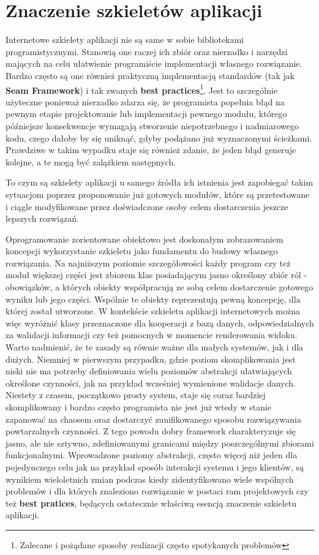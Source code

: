 \section{Znaczenie szkieletów aplikacji}
	Internetowe szkielety aplikacji nie są same w sobie bibliotekami programistycznymi. Stanowią one raczej ich zbiór oraz nierzadko i narzędzi mających na celu ułatwienie programiście implementacji własnego rozwiązanie. Bardzo często są one również praktyczną implementacją standardów (tak jak \textbf{Seam Framework}) i tak zwanych \textbf{best practices}\footnote{Zalecane i pożądane sposoby realizacji często spotykanych problemów}. Jest to szczególnie użyteczne ponieważ nierzadko zdarza się, że programista popełnia błąd na pewnym etapie projektowanie lub implementacji pewnego modułu, którego późniejsze konsekwencje wymagają stworzenie niepotrzebnego i nadmiarowego kodu, czego dałoby by się uniknąć, gdyby podążano już wyznaczonymi ścieżkami. Prawdziwe w takim wypadku staje się również zdanie, że jeden błąd generuje kolejne, a te mogą być zalążkiem następnych.
	
	To czym są szkielety aplikacji u samego źródła ich istnienia jest zapobiegać takim sytuacjom poprzez proponowanie już gotowych modułów, które są przetestowane i ciągle modyfikowane przez doświadczone osoby celem dostarczenia jeszcze lepszych rozwiązań\cite{art_of_java_web_dev}.
	
	Oprogramowanie zorientowane obiektowo jest doskonałym zobrazowaniem koncepcji wykorzystanie szkieletu jako fundamentu do budowy własnego rozwiązania. Na najniższym poziomie szczegółowości każdy program czy też moduł większej części jest zbiorem klas posiadającym jasno określony zbiór ról - obowiązków, a których obiekty współpracują ze sobą celem dostarczenie gotowego wyniku lub jego części. Wspólnie te obiekty reprezentują pewną koncepcję, dla której został utworzone. W kontekście szkieletu aplikacji internetowych można więc wyróżnić klasy przeznaczone dla kooperacji z bazą danych, odpowiedzialnych za walidacji informacji czy też pomocnych w momencie renderowania widoku. Warto nadmienić, że te zasady są równie ważne dla małych systemów, jak i dla dużych. Niemniej w pierwszym przypadku, gdzie poziom skomplikowania jest niski nie ma potrzeby definiowania wielu poziomów abstrakcji ułatwiających określone czynności, jak na przykład wcześniej wymienione walidacje danych. Niestety z czasem, początkowo prosty system, staje się coraz bardziej skomplikowany i bardzo często programista nie jest już wtedy w stanie zapanować na chaosem oraz dostarczyć zunifikowanego sposobu rozwiązywania powtarzalnych czynności. Z tego powodu dobry framework charakteryzuje się jasno, ale nie sztywno, zdefiniowanymi granicami między poszczególnymi zbiorami funkcjonalnymi. Wprowadzone poziomy abstrakcji, często więcej niż jeden dla pojedynczego celu jak na przykład sposób interakcji systemu i jego klientów, są wynikiem wieloletnich zmian podczas kiedy zidentyfikowano wiele wspólnych problemów i dla których znaleziono rozwiązanie w postaci ram projektowych czy też \textbf{best pratices}, będących ostatecznie właściwą esencją znaczenie szkieletu aplikacji\cite{framework_design_-_a_role_modeling_approach}.
	
